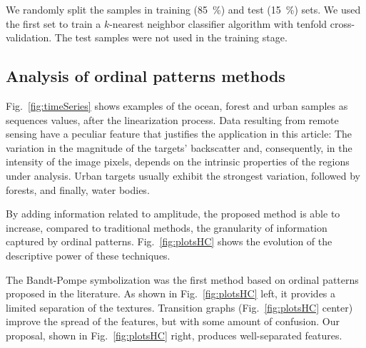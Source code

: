 \documentclass[journal]{IEEEtran}
\begin{document}

We randomly split the samples in training (\SI{85}{\percent}) and test (\SI{15}{\percent}) sets.
We used the first set to train a $k$-nearest neighbor classifier algorithm with tenfold cross-validation.
The test samples were not used in the training stage.

\subsection{Analysis of ordinal patterns methods}

Fig.~\ref{fig:timeSeries} shows examples of the ocean, forest and urban samples as sequences values, after the linearization process.
Data resulting from remote sensing have a peculiar feature that justifies the application in this article:
The variation in the magnitude of the targets' backscatter and, consequently, in the intensity of the image pixels, depends on the intrinsic properties of the regions under analysis.
Urban targets usually exhibit the strongest variation, followed by forests, and finally, water bodies.

By adding information related to amplitude, the proposed method is able to increase, compared to traditional methods, the granularity of information captured by ordinal patterns.
Fig.~\ref{fig:plotsHC} shows the evolution of the descriptive power of these techniques.

The Bandt-Pompe symbolization was the first method based on ordinal patterns proposed in the literature.
As shown in Fig.~\ref{fig:plotsHC} left, it provides a limited separation of the textures.
Transition graphs (Fig.~\ref{fig:plotsHC} center) improve the spread of the features, but with some amount of confusion.
Our proposal, shown in Fig.~\ref{fig:plotsHC} right, produces well-separated features.

\end{document}
